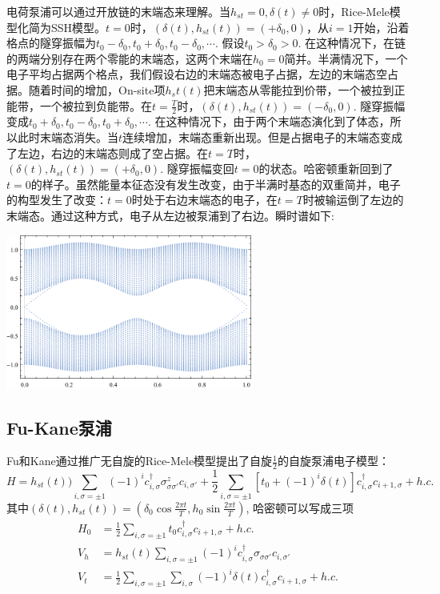 \documentclass{article}
\numberwithin{equation}{subsection}
\begin{document}
电荷泵浦可以通过开放链的末端态来理解。当$h_{st}=0,\delta(t)\neq0$时，Rice-Mele模型化简为SSH模型。$t=0$时，$(\delta(t),h_{st}(t))=(+\delta_0,0)$，从$i=1$开始，沿着格点的隧穿振幅为$t_0-\delta_0,t_0+\delta_0,t_0-\delta_0,\cdots$. 假设$t_0>\delta_0>0$. 在这种情况下，在链的两端分别存在两个零能的末端态，这两个末端在$h_0=0$简并。半满情况下，一个电子平均占据两个格点，我们假设右边的末端态被电子占据，左边的末端态空占据。随着时间的增加，On-site项$h_st(t)$把末端态从零能拉到价带，一个被拉到正能带，一个被拉到负能带。在$t=\frac{T}{2}$时，$(\delta(t),h_{st}(t))=(-\delta_0,0)$. 隧穿振幅变成$t_0+\delta_0,t_0-\delta_0,t_0+\delta_0,\cdots$. 在这种情况下，由于两个末端态演化到了体态，所以此时末端态消失。当$t$连续增加，末端态重新出现。但是占据电子的末端态变成了左边，右边的末端态则成了空占据。在$t=T$时，$(\delta(t),h_{st}(t))=(+\delta_0,0)$. 隧穿振幅变回$t=0$的状态。哈密顿重新回到了$t=0$的样子。虽然能量本征态没有发生改变，由于半满时基态的双重简并，电子的构型发生了改变：$t=0$时处于右边末端态的电子，在$t=T$时被输运倒了左边的末端态。通过这种方式，电子从左边被泵浦到了右边。瞬时谱如下:
\begin{center}
    \includegraphics[height=2in]{rice-mele1.pdf}
\end{center}
\subsection{Fu-Kane泵浦}
Fu和Kane通过推广无自旋的Rice-Mele模型提出了自旋$\frac{1}{2}$的自旋泵浦电子模型：
\begin{equation}
    H=h_{st}(t))\sum_{i,\sigma=\pm 1}(-1)^ic_{i,\sigma}^\dagger\sigma_{\sigma\sigma'}^zc_{i,\sigma'}+\frac{1}{2}\sum_{i,\sigma=\pm1}[t_0+(-1)^i\delta(t)]c_{i,\sigma}^\dagger c_{i+1,\sigma}+h.c.
\end{equation}
其中$(\delta(t),h_{st}(t))=(\delta_0\cos\frac{2\pi t}{T},h_0\sin\frac{2\pi t}{T})$, 哈密顿可以写成三项
\begin{equation}
    \begin{split}
        H_0&=\frac{1}{2}\sum_{i,\sigma=\pm1}t_0c_{i,\sigma}^\dagger c_{i+1,\sigma}+h.c.\\
        V_h&=h_{st}(t)\sum_{i,\sigma=\pm 1}(-1)^ic_{i,\sigma}^\dagger\sigma_{\sigma\sigma'}c_{i,\sigma'}\\
        V_t&=\frac{1}{2}\sum_{i,\sigma=\pm 1}\sum_{i,\sigma}(-1)^i\delta(t)c_{i,\sigma}^\dagger c_{i+1,\sigma}+h.c.
    \end{split}
\end{equation}
\end{document}
